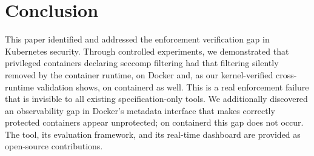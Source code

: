 \documentclass[conference]{IEEEtran}
\begin{document}
\section{Conclusion}

This paper identified and addressed the enforcement verification gap in Kubernetes security. Through controlled experiments, we demonstrated that privileged containers declaring seccomp filtering had that filtering silently removed by the container runtime, on Docker and, as our kernel-verified cross-runtime validation shows, on containerd as well. This is a real enforcement failure that is invisible to all existing specification-only tools. We additionally discovered an observability gap in Docker's metadata interface that makes correctly protected containers appear unprotected; on containerd this gap does not occur. The tool, its evaluation framework, and its real-time dashboard are provided as open-source contributions.

\balance
\end{document}
